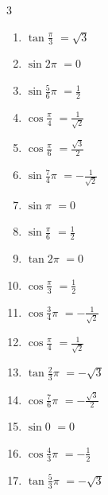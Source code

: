 \begin{multicols}{3}
\begin{enumerate}
  \item $\displaystyle \tan{\frac{\pi}{3}}$
        $\displaystyle =\sqrt{3}$

  \item $\displaystyle \sin{2\pi}$
        $\displaystyle =0$

  \item $\displaystyle \sin{\frac{5}{6}\pi}$
        $\displaystyle =\frac{1}{2}$

  \item $\displaystyle \cos{\frac{\pi}{4}}$
        $\displaystyle =\frac{1}{\sqrt{2}}$

  \item $\displaystyle \cos{\frac{\pi}{6}}$
        $\displaystyle =\frac{\sqrt{3}}{2}$

  \item $\displaystyle \sin{\frac{7}{4}\pi}$
        $\displaystyle =-\frac{1}{\sqrt{2}}$

  \item $\displaystyle \sin{\pi}$
        $\displaystyle =0$

  \item $\displaystyle \sin{\frac{\pi}{6}}$
        $\displaystyle =\frac{1}{2}$

  \item $\displaystyle \tan{2\pi}$
        $\displaystyle =0$

  \item $\displaystyle \cos{\frac{\pi}{3}}$
        $\displaystyle =\frac{1}{2}$

  \item $\displaystyle \cos{\frac{3}{4}\pi}$
        $\displaystyle =-\frac{1}{\sqrt{2}}$

  \item $\displaystyle \cos{\frac{\pi}{4}}$
        $\displaystyle =\frac{1}{\sqrt{2}}$

  \item $\displaystyle \tan{\frac{2}{3}\pi}$
        $\displaystyle =-\sqrt{3}$

  \item $\displaystyle \cos{\frac{7}{6}\pi}$
        $\displaystyle =-\frac{\sqrt{3}}{2}$

  \item $\displaystyle \sin{0}$
        $\displaystyle =0$

  \item $\displaystyle \cos{\frac{4}{3}\pi}$
        $\displaystyle =-\frac{1}{2}$

  \item $\displaystyle \tan{\frac{5}{3}\pi}$
        $\displaystyle =-\sqrt{3}$


\end{enumerate}
\end{multicols}
